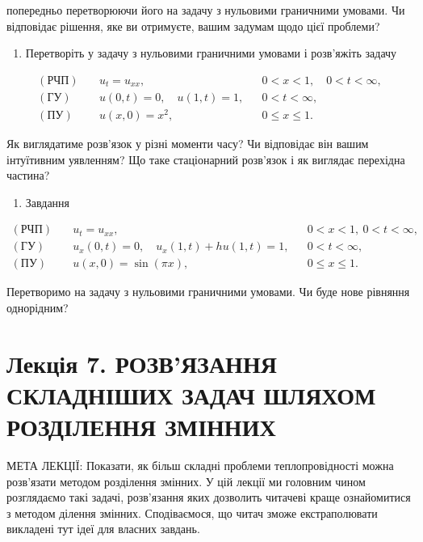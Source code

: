 \documentclass[
  ukrainian,
]{article}
\providecommand{\tightlist}{%
  \setlength{\itemsep}{0pt}\setlength{\parskip}{0pt}}
\begin{document}
попередньо перетворюючи його на задачу з нульовими граничними умовами.
Чи відповідає рішення, яке ви отримуєте, вашим задумам щодо цієї
проблеми?

\begin{enumerate}
\def\labelenumi{\arabic{enumi}.}
\setcounter{enumi}{1}
\tightlist
\item
  Перетворіть у задачу з нульовими граничними умовами і розв'яжіть
  задачу
\end{enumerate}

\[
\begin{aligned}
(\text{РЧП})\quad & u_t = u_{xx}, && 0 < x < 1,\quad 0 < t < \infty, \\
(\text{ГУ})\quad & u(0,t)=0,\quad u(1,t)=1, && 0 < t < \infty, \\
(\text{ПУ})\quad & u(x,0)=x^2, && 0 \le x \le 1.
\end{aligned}
\]

Як виглядатиме розв'язок у різні моменти часу? Чи відповідає він вашим
інтуїтивним уявленням? Що таке стаціонарний розв'язок і як виглядає
перехідна частина?

\begin{enumerate}
\def\labelenumi{\arabic{enumi}.}
\setcounter{enumi}{2}
\tightlist
\item
  Завдання
\end{enumerate}

\[
\begin{aligned}
(\text{РЧП})\quad & u_t = u_{xx}, && 0 < x < 1,\ 0 < t < \infty, \\
(\text{ГУ})\quad & u_x(0,t) = 0,\quad u_x(1,t) + h u(1,t) = 1, && 0 < t < \infty, \\
(\text{ПУ})\quad & u(x,0) = \sin(\pi x), && 0 \leqslant x \leqslant 1.
\end{aligned}
\]

Перетворимо на задачу з нульовими граничними умовами. Чи буде нове
рівняння однорідним?

\section{Лекція 7. РОЗВ'ЯЗАННЯ СКЛАДНІШИХ ЗАДАЧ ШЛЯХОМ РОЗДІЛЕННЯ
ЗМІННИХ}\label{ux43bux435ux43aux446ux456ux44f-7.-ux440ux43eux437ux432ux44fux437ux430ux43dux43dux44f-ux441ux43aux43bux430ux434ux43dux456ux448ux438ux445-ux437ux430ux434ux430ux447-ux448ux43bux44fux445ux43eux43c-ux440ux43eux437ux434ux456ux43bux435ux43dux43dux44f-ux437ux43cux456ux43dux43dux438ux445}

МЕТА ЛЕКЦІЇ: Показати, як більш складні проблеми теплопровідності можна
розв'язати методом розділення змінних. У цій лекції ми головним чином
розглядаємо такі задачі, розв'язання яких дозволить читачеві краще
ознайомитися з методом ділення змінних. Сподіваємося, що читач зможе
екстраполювати викладені тут ідеї для власних завдань.
\end{document}
